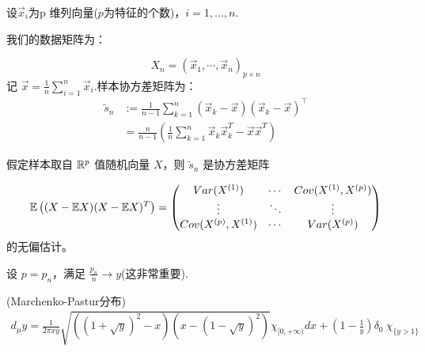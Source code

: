 设\(\vec{x}_i\)为p 维列向量($p$为特征的个数)，\(i=1,\ldots,n\).

我们的数据矩阵为：

\begin{equation*}
X_n = \left( \vec{x}_1, \cdots, \vec{x}_n \right)_{p \times n}
\end{equation*}
记 \(\vec{{x}} = \frac{1}{n} \sum\limits_{i=1}^n \vec{x}_i.\)样本协方差矩阵为：
\begin{equation*}
\begin{aligned}
    \tilde{s}_n &:= \frac{1}{n-1} \sum_{k=1}^n (\vec{x}_k - \vec{{x}}) (\vec{x}_k - \vec{{x}})^\top\\
    &= \frac{n}{n-1} \left( \frac{1}{n} \sum_{k=1}^n \vec{x}_k \vec{x}_k^T - \vec{{x}} \vec{{x}}^T \right)
\end{aligned}
\end{equation*}


假定样本取自 \(\mathbb{R}^p\) 值随机向量 \(X\)，则 \(\tilde{s}_n\) 是协方差矩阵

\begin{equation*}
\mathbb{E} \left( (X-\mathbb{E} X)(X-\mathbb{E} X)^T \right) =
\begin{pmatrix}
Var(X^{(1)}) & \cdots & Cov(X^{(1)}, X^{(p)}) \\
\vdots & \ddots & \vdots \\
Cov(X^{(p)}, X^{(1)}) & \cdots & Var(X^{(p)})
\end{pmatrix}
\end{equation*}
的无偏估计。

设 \(p = p_n\)，满足 \(\frac{p_n}{n} \to y\)(这非常重要).

\begin{definition}{(Marchenko-Pastur分布)}
\begin{equation*}
    \begin{aligned}
        d_\mu y=\frac{1}{2\pi x y} \sqrt{((1+\sqrt{y})^2-x)(x-(1-\sqrt{y})^2)} \chi_{[0,+\infty)}dx+(1-\frac 1y)\delta_0\ \chi_{\{y>1\}}
    \end{aligned}
\end{equation*}

\end{definition}

